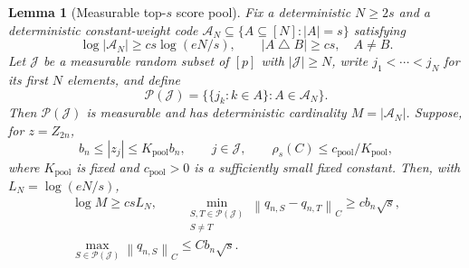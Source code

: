 \documentclass[a4paper,11pt,english]{article}
\newtheorem{lemma}[theorem]{Lemma}
\newcommand{\norm}[1]{\left\lVert #1\right\rVert}
\begin{document}
\begin{lemma}[Measurable top-$s$ score pool]
\label{lem:top-s-score-pool}
Fix a deterministic $N\ge2s$ and a deterministic constant-weight code
$\mathcal A_N\subseteq\{A\subseteq[N]:|A|=s\}$ satisfying
\begin{equation*}
 \log|\mathcal A_N|\ge cs\log(eN/s),
 \qquad |A\mathbin\triangle B|\ge cs,
 \quad A\ne B.
\end{equation*}
Let $\mathcal J$ be a measurable random subset of $[p]$ with
$|\mathcal J|\ge N$, write $j_1<\cdots<j_N$ for its first $N$ elements,
and define
\begin{equation*}
 \mathcal P(\mathcal J)
 =\bigl\{\{j_k:k\in A\}:A\in\mathcal A_N\bigr\}.
\end{equation*}
Then $\mathcal P(\mathcal J)$ is measurable and has deterministic
cardinality $M=|\mathcal A_N|$.  Suppose, for $z=Z_{2n}$,
\begin{equation*}
 b_n\le|z_j|\le K_{\mathrm{pool}}b_n,
 \qquad j\in\mathcal J,
 \qquad
 \rho_s(C)\le c_{\mathrm{pool}}/K_{\mathrm{pool}},
\end{equation*}
where $K_{\mathrm{pool}}$ is fixed and $c_{\mathrm{pool}}>0$ is a
sufficiently small fixed constant.  Then, with $L_N=\log(eN/s)$,
\begin{equation}\label{eq:top-s-score-pool}
\begin{gathered}
 \log M\ge csL_N,\qquad
 \min_{\substack{S,T\in\mathcal P(\mathcal J)\\S\ne T}}
 \norm{q_{n,S}-q_{n,T}}_C\ge cb_n\sqrt s,\\
 \max_{S\in\mathcal P(\mathcal J)}
 \norm{q_{n,S}}_C\le Cb_n\sqrt s.
\end{gathered}
\end{equation}
\end{lemma}
\end{document}
